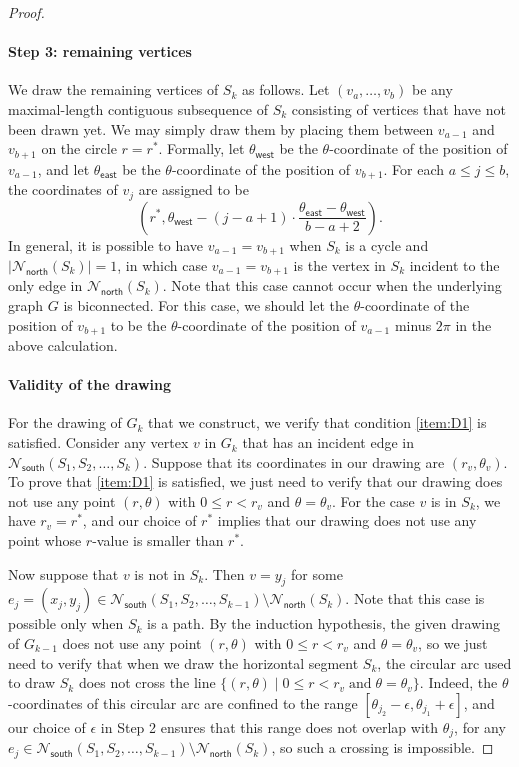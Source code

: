 \documentclass{theoretics}
\newcommand{\thetawest}{\theta_{\mathsf{west}}}
\newcommand{\thetaeast}{\theta_{\mathsf{east}}}
\newcommand{\Nnorth}{\mathcal{N}_\mathsf{north}}
\newcommand{\Nsouth}{\mathcal{N}_\mathsf{south}}
\begin{document}
\begin{proof}
\paragraph{Step 3: remaining vertices}
We draw the remaining vertices of $S_k$ as follows. 
Let $(v_{a}, \ldots, v_b)$ be any maximal-length contiguous subsequence of $S_k$ consisting of vertices that have not been drawn yet. We may simply draw them by placing them between $v_{a-1}$ and $v_{b+1}$ on the circle $r = r^\ast$. Formally, let $\thetawest$ be the $\theta$-coordinate of the position of $v_{a-1}$, and let $\thetaeast$ be the $\theta$-coordinate of the position of $v_{b+1}$.  
For each $a \leq j \leq b$, the coordinates of $v_j$ are assigned to be \[\left(r^\ast, \thetawest - (j-a+1) \cdot \frac{\thetaeast - \thetawest}{b-a+2}\right).\]
In general, it is possible to have $v_{a-1}=v_{b+1}$ when $S_k$ is a cycle and $|\Nnorth(S_k)| = 1$, in which case $v_{a-1}=v_{b+1}$ is the vertex in $S_k$ incident to the only edge in $\Nnorth(S_k)$. Note that this case cannot occur when the underlying graph $G$ is biconnected. For this case, we should let the $\theta$-coordinate of the position of $v_{b+1}$ to be the $\theta$-coordinate of the position of $v_{a-1}$ minus $2\pi$ in the above calculation. 
 

\paragraph{Validity of the drawing} For the drawing of $G_k$ that we construct, we verify that condition \ref{item:D1} is satisfied. %
Consider any vertex $v$ in $G_k$ that has an incident edge in $\Nsouth(S_1, S_2, \ldots, S_k)$. Suppose that its coordinates in our drawing are $(r_v, \theta_v)$. To prove that \ref{item:D1} is satisfied, we just need to verify that our drawing does not use any point $(r,\theta)$ with $0\leq r < r_v$ and $\theta = \theta_v$. For the case $v$ is in $S_k$, we have $r_v = r^\ast$, and our choice of $r^\ast$ implies that our drawing does not use any point whose $r$-value is smaller than $r^\ast$. 

Now suppose that $v$ is not in $S_k$.  Then $v=y_j$ for some $e_j=(x_j, y_j) \in \Nsouth(S_1, S_2, \ldots, S_{k-1}) \setminus \Nnorth(S_k)$. Note that this case is possible only when $S_k$ is a path. By the induction hypothesis, the given drawing of $G_{k-1}$ does not use any point $(r,\theta)$ with $0\leq r < r_v$ and $\theta = \theta_v$, so we just need to verify that when we draw the horizontal segment $S_k$, the circular arc used to draw $S_k$ does not cross the line $\{ (r,\theta) \mid 0\leq r < r_v \; \text{and} \; \theta = \theta_v\}$. Indeed, the $\theta$-coordinates of this circular arc are confined to the range $[\theta_{j_2}-\epsilon, \theta_{j_1}+\epsilon]$, and our choice of $\epsilon$ in Step 2 ensures that this range does not overlap with  $\theta_j$, for any $e_j \in \Nsouth(S_1, S_2, \ldots, S_{k-1}) \setminus \Nnorth(S_k)$, so such a crossing is impossible. 


\end{proof}
\end{document}
